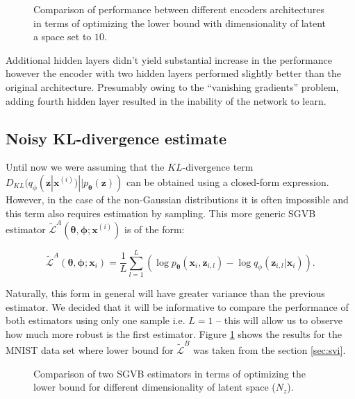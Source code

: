 \documentclass[../report.tex]{subfiles}
\begin{document}
\begin{figure}[!htb]
\centering

  \caption[1]{Comparison of performance between different encoders architectures in terms of optimizing the lower bound with dimensionality of latent a space set to $10$. }
\end{figure}

Additional hidden layers didn't yield substantial increase in the performance however the encoder with two hidden layers performed slightly better than the original architecture. Presumably owing to the ``vanishing gradients'' problem, adding fourth hidden layer resulted in the inability of the network to learn.

\subsection{Noisy KL-divergence estimate}
Until now we were assuming that the $KL$-divergence term $D_{KL} (q_{\phi}(\mathbf{z} | \mathbf{x}^{(i)}) || p_{\boldsymbol{\theta}}( \mathbf{z}) ) $ can be obtained using a closed-form expression. However, in the case of the non-Gaussian distributions it is often impossible and this term also requires estimation by sampling. This more generic SGVB estimator $\widetilde{\mathcal{L}}^{A}(\boldsymbol{\theta}, \boldsymbol{\phi}; \mathbf{x}^{(i)})$ is of the form:

$$ \widetilde{\mathcal{L}}^{A}(\boldsymbol{\theta}, \boldsymbol{\phi}; \mathbf{x}_{i}) = \frac{1}{L} \sum_{l=1}^L \left( \log p_{\boldsymbol{\theta}}(\mathbf{x}_{i}, \mathbf{z}_{i,l}) - \log q_{\phi}(\mathbf{z}_{i,l} | \mathbf{x}_i) \right).$$

Naturally, this form in general will have greater variance than the previous estimator. We decided that it will be informative to compare the performance of both estimators using only one sample i.e. $L=1$ -- this will allow us to observe how much more robust is the first estimator. Figure \ref{fig:mnist_LAvsLB} shows the results for the MNIST data set where lower bound for $\widetilde{\mathcal{L}}^{B}$ was taken from the section \ref{sec:svi}.

\begin{figure}[!htb]
\centering

  \caption[1]{Comparison of two SGVB estimators in terms of optimizing the lower bound for different dimensionality of latent space ($N_z$). }
  \label{fig:mnist_LAvsLB}
\end{figure}
\end{document}
